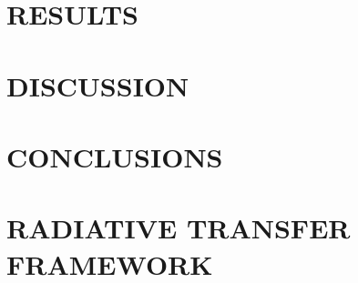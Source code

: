 \documentclass[preprint2]{aastex}              %
\begin{document}
\section{RESULTS}




\section{DISCUSSION}



\section{CONCLUSIONS}






\appendix
\twocolumn
\appendixpage

\section{RADIATIVE TRANSFER FRAMEWORK}
\end{document}
